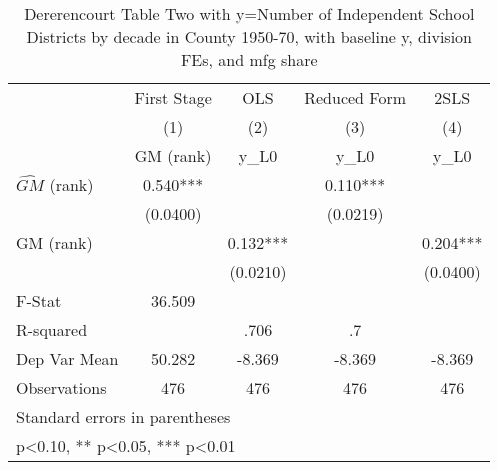 \begin{table}[htbp]\centering
\def\sym#1{\ifmmode^{#1}\else\(^{#1}\)\fi}
\caption{Dererencourt Table Two with y=Number of Independent School Districts by decade in County 1950-70, with baseline y, division FEs, and mfg share}
\begin{tabular}{l*{4}{c}}
\toprule
                    & First Stage   &         OLS   &Reduced Form   &        2SLS   \\
                    &\multicolumn{1}{c}{(1)}&\multicolumn{1}{c}{(2)}&\multicolumn{1}{c}{(3)}&\multicolumn{1}{c}{(4)}\\
                    &\multicolumn{1}{c}{GM  (rank)}&\multicolumn{1}{c}{y\_L0}&\multicolumn{1}{c}{y\_L0}&\multicolumn{1}{c}{y\_L0}\\
\midrule
$\hat{GM}$ (rank)   &       0.540***&               &       0.110***&               \\
                    &    (0.0400)   &               &    (0.0219)   &               \\
\addlinespace
GM  (rank)          &               &       0.132***&               &       0.204***\\
                    &               &    (0.0210)   &               &    (0.0400)   \\
\midrule
F-Stat              &      36.509   &               &               &               \\
R-squared           &               &        .706   &          .7   &               \\
Dep Var Mean        &      50.282   &      -8.369   &      -8.369   &      -8.369   \\
Observations        &         476   &         476   &         476   &         476   \\
\bottomrule
\multicolumn{5}{l}{\footnotesize Standard errors in parentheses}\\
\multicolumn{5}{l}{\footnotesize * p<0.10, ** p<0.05, *** p<0.01}\\
\end{tabular}
\end{table}
